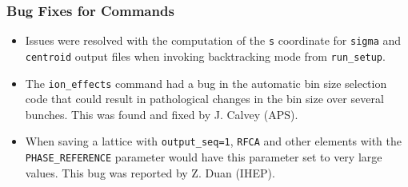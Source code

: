 \documentclass[11pt]{article}
\begin{document}
\subsubsection{Bug Fixes for Commands}
\begin{itemize}
\item Issues were resolved with the computation of the \verb|s| coordinate for \verb|sigma| and \verb|centroid|
  output files when invoking backtracking mode from \verb|run_setup|.
\item The \verb|ion_effects| command had a bug in the automatic bin size selection code that could result in pathological changes in the
  bin size over several bunches. This was found and fixed by J. Calvey (APS).
\item When saving a lattice with \verb|output_seq=1|, \verb|RFCA| and other elements with the \verb|PHASE_REFERENCE| parameter
  would have this parameter set to very large values. This bug was reported by Z. Duan (IHEP).
\end{itemize}
\end{document}

